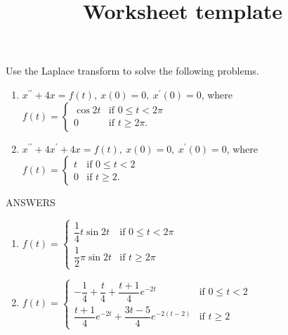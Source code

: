 \documentclass[12pt]{article}
\title{Worksheet template}
\begin{document}
\bigskip
\bigskip

Use the Laplace transform to solve the following problems.

\begin{enumerate}

\item
$x^{\prime \prime} + 4x = f(t), \> x(0) = 0, \> x^{\prime}(0) = 0$, where \newline
$f(t) = \begin{cases}
	\cos 2t & \mbox{if } 0 \le t < 2\pi \\
    0 & \mbox{if } t \ge 2\pi.
\end{cases}$

\item
$x^{\prime \prime} + 4x^{\prime} + 4x = f(t), \> x(0) = 0, \> x^{\prime}(0) = 0$, where \newline
$f(t) = \begin{cases}
	t & \mbox{if } 0 \le t < 2 \\
    0 & \mbox{if } t \ge 2.
\end{cases}$

\end{enumerate}

\bigskip

\newpage

ANSWERS

\begin{enumerate}
	\item $f(t) = \begin{cases}
		\dfrac{1}{4} t \sin 2t & \mbox{if } 0 \le t < 2\pi \\
    	\dfrac{1}{2} \pi \sin 2t & \mbox{if } t \ge 2\pi
	\end{cases}$

	\item $f(t) = \begin{cases}
		- \dfrac{1}{4} + \dfrac{t}{4} + \dfrac{t+1}{4} e^{-2t} & \mbox{if } 0 \le t < 2 \\
    	\dfrac{t+1}{4} e^{-2t} + \dfrac{3t-5}{4} e^{-2(t-2)} & \mbox{if } t \ge 2
	\end{cases}$

\end{enumerate}
\end{document}
